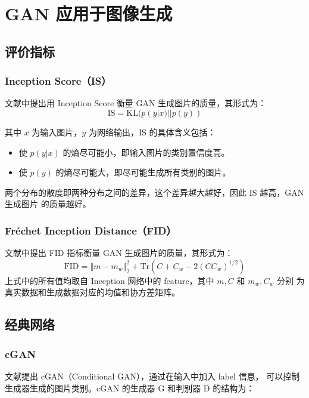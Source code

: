 \chapter{GAN 应用于图像生成}

\section{评价指标}

\subsection{Inception Score（IS）}
文献中提出用 Inception Score 衡量 GAN 生成图片的质量，其形式为：
\begin{equation}
  \label{equ:IS-score}
  \mathrm{IS} = \mathrm{KL}(p(y|x) || p(y))
\end{equation}

其中 $x$ 为输入图片，$y$ 为网络输出，IS 的具体含义包括：

\begin{itemize}
  \item 使 $p(y|x)$ 的熵尽可能小，即输入图片的类别置信度高。
  \item 使 $p(y)$ 的熵尽可能大，即尽可能生成所有类别的图片。
\end{itemize}

两个分布的散度即两种分布之间的差异，这个差异越大越好，因此 IS 越高，GAN 生成图片
的质量越好。

\subsection{Fréchet Inception Distance（FID）}
文献中提出 FID 指标衡量 GAN 生成图片的质量，其形式为：
\begin{equation}
  \label{equ:FID}
  \mathrm{FID} = \left\Vert m-m_w \right\Vert _{2}^2 + \mathrm{Tr} \left( C + C_w - 2 \left( C C_w \right)^{1/2} \right)
\end{equation}
上式中的所有值均取自 Inception 网络中的 feature，其中 $m, C$ 和 $m_w, C_w$ 分别
为真实数据和生成数据对应的均值和协方差矩阵。

\section{经典网络}

\subsection{cGAN}
文献提出 cGAN（Conditional GAN），通过在输入中加入 label 信息，
可以控制生成器生成的图片类别。cGAN 的生成器 G 和判别器 D 的结构为：

